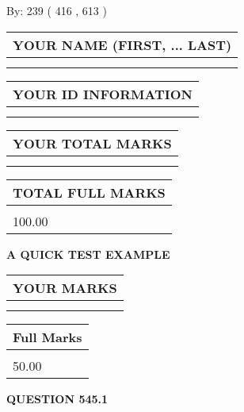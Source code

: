 \documentclass[12pt]{article}
\begin{document}
   
\hspace{1.0in} By: 
 239 ( 416 ,  613 )
   
   
   
   
\newpage 
\setcounter{page}{ 
   545001 } 
   
   
   
   
\noindent\begin{tabular}{|l|}
\hline
YOUR NAME (FIRST, ... LAST)  \\
\hline
 \\ 
 \\ 
\hline
\end{tabular}
\hspace{0.05in} \begin{tabular}{|l|}
\hline
 YOUR   ID   INFORMATION  \\
\hline
 \\ 
 \\ 
\hline
\end{tabular}
   
   
\vspace{0.2in}\noindent\begin{tabular}{|l|}
\hline
YOUR TOTAL MARKS  \\
\hline
 \\ 
 \\ 
\hline
\end{tabular}
\hspace{0.05in} \begin{tabular}{|l|}
\hline
TOTAL FULL MARKS  \\
\hline
 \\ 
100.00 \\
\hline
\end{tabular}
   
   
 \vspace{0.2in}
{\LARGE {\textbf{ A QUICK TEST EXAMPLE}}}
   
   
  
\vspace{0.2in}
  
\noindent\begin{tabular}{|l|}
\hline
 YOUR MARKS  \\
\hline
 \\ 
 \\ 
\hline
\end{tabular}
\hspace{0.05in} \begin{tabular}{|l|}
\hline
 Full Marks  \\
\hline
 \\ 
50.00 \\
\hline
\end{tabular}
{\textbf{\Large{QUESTION
545.1 
}}}
  
\end{document}
